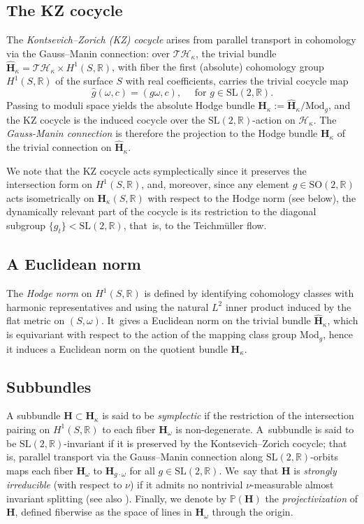 \documentclass[JEP,XML,SOM,Unicode,published]{cedram}
\theoremstyle{plain}
\theoremstyle{definition}
\numberwithin{equation}{subsection}
\newcommand\bR{\mathbb{R}}\let\R\bR
\newcommand\cH{\mathcal{H}}
\newcommand\cT{\mathcal{T}}
\newcommand{\Mod}{\mathrm{Mod}}
\newcommand{\SL}{\mathrm{SL}}
\newcommand{\SO}{\mathrm{SO}}
\newcommand{\bfH}{\boldsymbol{H}}
\begin{document}
\subsection{The KZ cocycle} The \emph{Kontsevich–Zorich (KZ) cocycle} arises from parallel transport in cohomology via the Gauss–Manin connection: over $\cT\cH_\kappa$, the trivial \hbox{bundle} $\widehat{\bfH}_\kappa = \cT\cH_\kappa \times H^1(S, \mathbb{R})$, with fiber the first (absolute) cohomology group $H^1(S, \mathbb{R})$ of the surface $S$ with real coefficients, carries the trivial cocycle map
\[
\widehat{g}(\omega, c) = (g\omega, c), \quad \text{ for } g \in \SL(2,\mathbb{R}).
\]
Passing to moduli space yields the absolute Hodge bundle $\bfH_\kappa := \widehat{\bfH}_\kappa / \Mod_g$, and the KZ cocycle is the induced cocycle over the $\SL(2,\mathbb{R})$-action on $\cH_\kappa$. The \emph{Gauss-Manin connection} is therefore the projection to the Hodge bundle $\bfH_\kappa$ of the trivial connection on $\widehat{\bfH}_\kappa$.

We note that the KZ cocycle acts symplectically since it preserves the intersection form on $H^1(S,\bR)$, and, moreover, since any element $g\in \SO(2, \R)$ acts isometrically on
$\textbf{H}_\kappa(S, \bR)$ with respect to the Hodge norm (see below), the dynamically relevant part of the
cocycle is its restriction to the diagonal subgroup $\{g_t\} <\SL(2,\R)$, that~is, to the Teichmüller flow.

\subsection{A Euclidean norm}\label{eucnorm} The \emph{Hodge norm} on $H^1(S, \mathbb{R})$ is defined by identifying cohomology classes with harmonic representatives and using the natural $L^2$ inner product induced by the flat metric on $(S, \omega)$. It~gives a Euclidean norm on the trivial bundle $\widehat{\bfH}_\kappa$, which is equivariant with respect to the action of the mapping class group $\Mod_g$, hence it induces a Euclidean norm on the quotient bundle $\bfH_\kappa$.

\subsection{Subbundles}
A subbundle $\bfH \subset \bfH_\kappa$ is said to be \emph{symplectic} if the restriction of the intersection pairing on $H^1(S, \mathbb{R})$ to each fiber $\bfH_\omega$ is non-degenerate. A~subbundle is said to be $\SL(2,\mathbb{R})$-invariant if it is preserved by the Kontsevich–Zorich cocycle; that is, parallel transport via the Gauss–Manin connection along $\SL(2,\mathbb{R})$-orbits maps each fiber $\bfH_\omega$ to $\bfH_{g \cdot \omega}$ for all $g \in \SL(2,\mathbb{R})$. We~say that $\bfH$ is \emph{strongly irreducible} (with respect to $\nu$) if it admits no nontrivial $\nu$-measurable almost invariant splitting (see also \cite[Def.\,1.3]{CE13}). Finally, we denote by $\mathbb{P}(\bfH)$ the \emph{projectivization} of $\bfH$, defined fiberwise as the space of lines in $\bfH_\omega$ through the origin.
\end{document}
